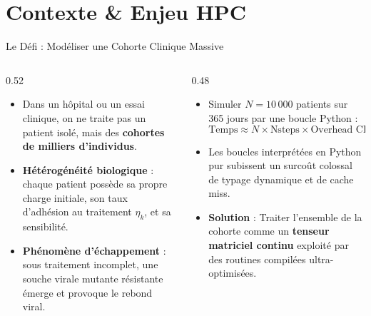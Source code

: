 \documentclass[aspectratio=169, 10pt, french]{beamer}
\begin{document}
\section{Contexte \& Enjeu HPC}
\begin{frame}{Le Défi : Modéliser une Cohorte Clinique Massive}
    \begin{columns}[c]
        \begin{column}{0.52\textwidth}
            \begin{cadreclinique}
                \small
                \begin{itemize}
                    \item Dans un hôpital ou un essai clinique, on ne traite pas un patient isolé, mais des \textbf{cohortes de milliers d'individus}.
                    \item \textbf{Hétérogénéité biologique} : chaque patient possède sa propre charge initiale, son taux d'adhésion au traitement $\eta_k$, et sa sensibilité.
                    \item \textbf{Phénomène d'échappement} : sous traitement incomplet, une souche virale mutante résistante émerge et provoque le rebond viral.
                \end{itemize}
            \end{cadreclinique}
        \end{column}

        \begin{column}{0.48\textwidth}
            \begin{cadrehpc}
                \small
                \begin{itemize}
                    \item Simuler $N = 10\,000$ patients sur 365 jours par une boucle Python :
                    $$\text{Temps} \approx N \times \text{Nsteps} \times \text{Overhead CPython}$$
                    \item Les boucles interprétées en Python pur subissent un surcoût colossal de typage dynamique et de cache miss.
                    \item \textbf{Solution} : Traiter l'ensemble de la cohorte comme un \textbf{tenseur matriciel continu} exploité par des routines compilées ultra-optimisées.
                \end{itemize}
            \end{cadrehpc}
        \end{column}
    \end{columns}
\end{frame}
\end{document}
